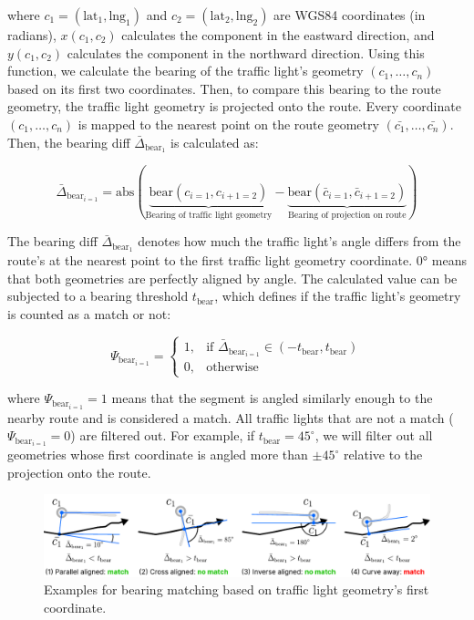 where $c_1 = (\text{lat}_1, \text{lng}_1)$ and $c_2 = (\text{lat}_2, \text{lng}_2)$ are WGS84 coordinates (in radians), $x(c_1, c_2)$ calculates the component in the eastward direction, and $y(c_1, c_2)$ calculates the component in the northward direction. Using this function, we calculate the bearing of the traffic light's geometry $(c_1, \dots, c_n)$ based on its first two coordinates. Then, to compare this bearing to the route geometry, the traffic light geometry is projected onto the route. Every coordinate $(c_1, \dots, c_n)$ is mapped to the nearest point on the route geometry $(\bar{c_1}, \dots, \bar{c_n})$. Then, the bearing diff $\bar{\Delta}_{\text{bear}_1}$ is calculated as:

\begin{equation}
    \bar{\Delta}_{\text{bear}_{i=1}} = 
        \text{abs}(\underbrace{\text{bear}(c_{i=1}, c_{i+1=2})}_{\text{Bearing of traffic light geometry}} - \underbrace{\text{bear}(\bar{c}_{i=1}, \bar{c}_{i+1=2})}_{\text{Bearing of projection on route}})
\end{equation}

The bearing diff $\bar{\Delta}_{\text{bear}_1}$ denotes how much the traffic light's angle differs from the route's at the nearest point to the first traffic light geometry coordinate. 0° means that both geometries are perfectly aligned by angle. The calculated value can be subjected to a bearing threshold $t_{\text{bear}}$, which defines if the traffic light's geometry is counted as a match or not:

\begin{equation}
\Psi_{\text{bear}_{i=1}} = 
    \begin{cases}
            1,& \text{if } \bar{\Delta}_{\text{bear}_{i=1}} \in \left(-t_{\text{bear}}, t_{\text{bear}}\right)\\
            0,              & \text{otherwise}
        \end{cases}
\end{equation}

where $\Psi_{\text{bear}_{i=1}} = 1$ means that the segment is angled similarly enough to the nearby route and is considered a match. All traffic lights that are not a match ($\Psi_{\text{bear}_{i=1}} = 0$) are filtered out. For example, if $t_{\text{bear}} = 45^{\circ}$, we will filter out all geometries whose first coordinate is angled more than $\pm 45^{\circ}$ relative to the projection onto the route. 

\begin{figure}[b]
\centering
\includegraphics[width=\linewidth]{images/sg-selection-bearing-filter.pdf}
\caption{Examples for bearing matching based on traffic light geometry's first coordinate.}
\label{fig:sg-selection-bearing-filter}
\end{figure}

